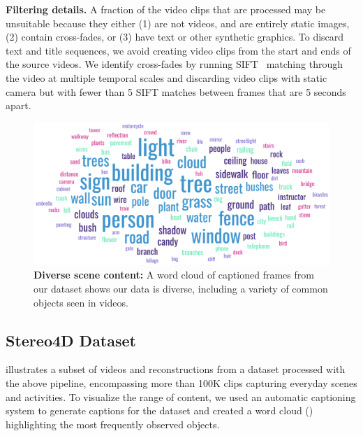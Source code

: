 \medskip
\noindent \textbf{Filtering details.} A fraction of the video clips that are processed may be unsuitable because they either (1) are not videos, and are entirely static images, (2) contain cross-fades, or (3) have text or other synthetic graphics. To discard text and title sequences, we avoid creating video clips from the start and ends of the source videos. We identify cross-fades by running SIFT~\cite{lowe2004sift} matching through the video at multiple temporal scales and discarding video clips with static camera but with fewer than 5 SIFT matches between frames that are 5 seconds apart.



\begin{figure}[t]
    \centering
    \includegraphics[width=\linewidth]{fig/wordcloud.png}
    \caption{\textbf{Diverse scene content:} A word cloud of captioned frames from our dataset shows our data is diverse, including a variety of common objects seen in videos.}
    \label{fig:wordcloud}
\end{figure}


\subsection{Stereo4D Dataset}

 illustrates a subset of videos and reconstructions from a dataset processed with the above pipeline, encompassing more than 100K clips capturing everyday scenes and activities. To visualize the range of content, we used an automatic captioning system to generate captions for the dataset and created a word cloud () highlighting the most frequently observed objects.





